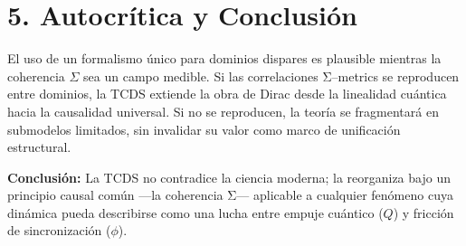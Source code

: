 \documentclass[12pt,a4paper]{article}
\begin{document}
\section{5. Autocrítica y Conclusión}
El uso de un formalismo único para dominios dispares es plausible mientras la coherencia \(\Sigma\) sea un campo medible.  
Si las correlaciones Σ–metrics se reproducen entre dominios, la TCDS extiende la obra de Dirac desde la linealidad cuántica hacia la causalidad universal.  
Si no se reproducen, la teoría se fragmentará en submodelos limitados, sin invalidar su valor como marco de unificación estructural.

\textbf{Conclusión:}  
La TCDS no contradice la ciencia moderna; la reorganiza bajo un principio causal común —la coherencia Σ— aplicable a cualquier fenómeno cuya dinámica pueda describirse como una lucha entre empuje cuántico (\(Q\)) y fricción de sincronización (\(\phi\)).
\end{document}
